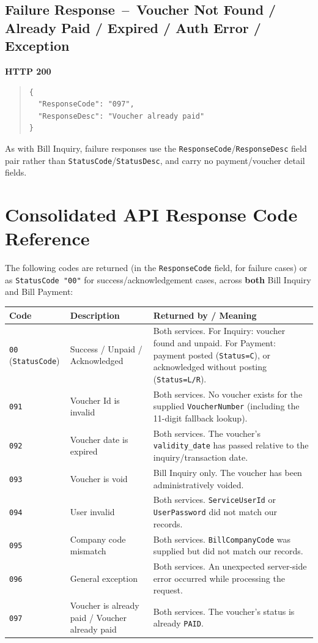 \documentclass[11pt]{article}
\begin{document}
\subsection{Failure Response \,--\, Voucher Not Found / Already Paid / Expired / Auth Error / Exception}
\textbf{HTTP 200}
\begin{quote}
\begin{verbatim}
{
  "ResponseCode": "097",
  "ResponseDesc": "Voucher already paid"
}
\end{verbatim}
\end{quote}
\noindent As with Bill Inquiry, failure responses use the \texttt{ResponseCode}/\texttt{ResponseDesc}
field pair rather than \texttt{StatusCode}/\texttt{StatusDesc}, and carry no payment/voucher
detail fields.

\section{Consolidated API Response Code Reference}
\label{sec:codes}
The following codes are returned (in the \texttt{ResponseCode} field, for failure cases) or as
\texttt{StatusCode "00"} for success/acknowledgement cases, across \textbf{both} Bill Inquiry
and Bill Payment:

\begin{center}
\begin{longtable}{@{}lp{}p{}@{}}
\toprule
\textbf{Code} & \textbf{Description} & \textbf{Returned by / Meaning} \\
\midrule
\endhead
\texttt{00} (\texttt{StatusCode}) & Success / Unpaid / Acknowledged & Both services. For Inquiry: voucher found and unpaid. For Payment: payment posted (\texttt{Status=C}), or acknowledged without posting (\texttt{Status=L/R}). \\[4pt]
\texttt{091} & Voucher Id is invalid & Both services. No voucher exists for the supplied \texttt{VoucherNumber} (including the 11-digit fallback lookup). \\[4pt]
\texttt{092} & Voucher date is expired & Both services. The voucher's \texttt{validity\_date} has passed relative to the inquiry/transaction date. \\[4pt]
\texttt{093} & Voucher is void & Bill Inquiry only. The voucher has been administratively voided. \\[4pt]
\texttt{094} & User invalid & Both services. \texttt{ServiceUserId} or \texttt{UserPassword} did not match our records. \\[4pt]
\texttt{095} & Company code mismatch & Both services. \texttt{BillCompanyCode} was supplied but did not match our records. \\[4pt]
\texttt{096} & General exception & Both services. An unexpected server-side error occurred while processing the request. \\[4pt]
\texttt{097} & Voucher is already paid / Voucher already paid & Both services. The voucher's status is already \texttt{PAID}. \\
\bottomrule
\end{longtable}
\end{center}
\end{document}
